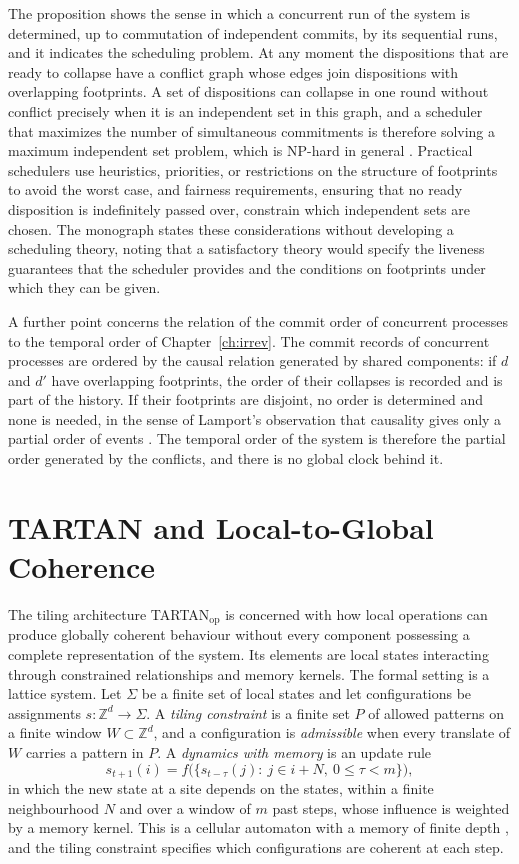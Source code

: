 \documentclass[11pt,twoside,openright]{book}
\theoremstyle{plain}
\theoremstyle{definition}
\theoremstyle{remark}
\begin{document}
The proposition shows the sense in which a concurrent run of the system is determined, up to commutation of independent commits, by its sequential runs, and it indicates the scheduling problem. At any moment the dispositions that are ready to collapse have a conflict graph whose edges join dispositions with overlapping footprints. A set of dispositions can collapse in one round without conflict precisely when it is an independent set in this graph, and a scheduler that maximizes the number of simultaneous commitments is therefore solving a maximum independent set problem, which is NP-hard in general \cite{karp1972}. Practical schedulers use heuristics, priorities, or restrictions on the structure of footprints to avoid the worst case, and fairness requirements, ensuring that no ready disposition is indefinitely passed over, constrain which independent sets are chosen. The monograph states these considerations without developing a scheduling theory, noting that a satisfactory theory would specify the liveness guarantees that the scheduler provides and the conditions on footprints under which they can be given.

A further point concerns the relation of the commit order of concurrent processes to the temporal order of Chapter~\ref{ch:irrev}. The commit records of concurrent processes are ordered by the causal relation generated by shared components: if $d$ and $d'$ have overlapping footprints, the order of their collapses is recorded and is part of the history. If their footprints are disjoint, no order is determined and none is needed, in the sense of Lamport's observation that causality gives only a partial order of events \cite{lamport1978}. The temporal order of the system is therefore the partial order generated by the conflicts, and there is no global clock behind it.

\section{TARTAN and Local-to-Global Coherence}

The tiling architecture TARTAN$_{\mathrm{op}}$ is concerned with how local operations can produce globally coherent behaviour without every component possessing a complete representation of the system. Its elements are local states interacting through constrained relationships and memory kernels. The formal setting is a lattice system. Let $\Sigma$ be a finite set of local states and let configurations be assignments $s:\mathbb{Z}^d\to\Sigma$. A \emph{tiling constraint} is a finite set $P$ of allowed patterns on a finite window $W\subset\mathbb{Z}^d$, and a configuration is \emph{admissible} when every translate of $W$ carries a pattern in $P$. A \emph{dynamics with memory} is an update rule
\[
s_{t+1}(i)=f\big(\{s_{t-\tau}(j):\ j\in i+N,\ 0\le\tau<m\}\big),
\]
in which the new state at a site depends on the states, within a finite neighbourhood $N$ and over a window of $m$ past steps, whose influence is weighted by a memory kernel. This is a cellular automaton with a memory of finite depth \cite{vonneumann1966,toffoli1987}, and the tiling constraint specifies which configurations are coherent at each step.
\end{document}
